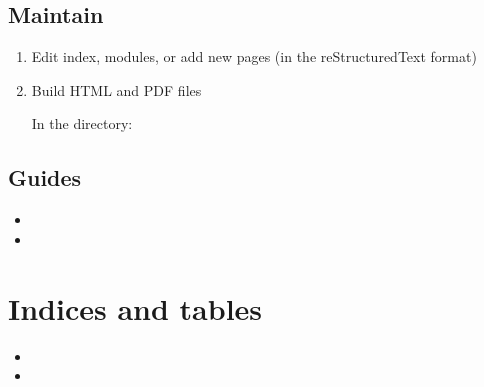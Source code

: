 \documentclass[letterpaper,10pt,english]{sphinxmanual}
\begin{document}
\section{Maintain}
\label{\detokenize{ressources:maintain}}\begin{enumerate}
%
\item {} 
\sphinxAtStartPar
Edit index, modules, or add new pages (in the reStructured\sphinxhyphen{}Text format)

\item {} 
\sphinxAtStartPar
Build HTML and PDF files

\sphinxAtStartPar
In the  directory:

\begin{sphinxVerbatim}[commandchars=\\\{\}]
 
 
\end{sphinxVerbatim}

\end{enumerate}


\section{Guides}
\label{\detokenize{ressources:guides}}\begin{itemize}
\item {} 
\sphinxAtStartPar
{}

\item {} 
\sphinxAtStartPar
{}

\end{itemize}


\chapter{Indices and tables}
\label{\detokenize{index:indices-and-tables}}\begin{itemize}
\item {} 
\sphinxAtStartPar
{}

\item {} 
\sphinxAtStartPar
{}

\end{itemize}
\end{document}
